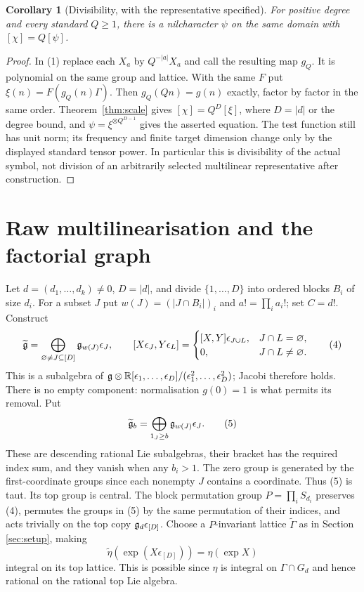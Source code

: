 \documentclass[11pt]{article}
\newtheorem{corollary}[theorem]{Corollary}
\newcommand{\R}{\mathbb R}\newcommand{\Q}{\mathbb Q}
\begin{document}
\begin{corollary}[Divisibility, with the representative specified]\label{cor:divide}
For positive degree and every standard $Q\geq1$, there is a nilcharacter
$\psi$ on the same domain with $[\chi]=Q[\psi]$.
\end{corollary}
\begin{proof}
In (1) replace each $X_a$ by $Q^{-|a|}X_a$ and call the resulting map
$g_Q$. It is polynomial on the same group and lattice. With the same
$F$ put $\xi(n)=F(g_Q(n)\Gamma)$. Then $g_Q(Qn)=g(n)$ exactly, factor
by factor in the same order. Theorem~\ref{thm:scale} gives
$[\chi]=Q^D[\xi]$, where $D=|d|$ or the degree bound, and
$\psi=\xi^{\otimes Q^{D-1}}$ gives the asserted equation.
The test function still has unit norm; its frequency and finite target
dimension change only by the displayed standard tensor power. In
particular this is divisibility of the actual symbol, not division of
an arbitrarily selected multilinear representative after construction.
\end{proof}

\section{Raw multilinearisation and the factorial graph}\label{sec:raw}
Let $d=(d_1,\ldots,d_k)\ne0$, $D=|d|$, and divide $\{1,\ldots,D\}$
into ordered blocks $B_i$ of size $d_i$. For a subset $J$ put
$w(J)=(|J\cap B_i|)_i$ and $a!=\prod_i a_i!$; set $C=d!$.
Construct
\[
 \widetilde{\mathfrak g}=\bigoplus_{\varnothing\ne J\subseteq[D]}\mathfrak g_{w(J)}\epsilon_J,
 \qquad
 [X\epsilon_J,Y\epsilon_L]=
 \begin{cases}[X,Y]\epsilon_{J\cup L},&J\cap L=\varnothing,\\
 0,&J\cap L\ne\varnothing.
 \end{cases}                                             \tag{4}
\]
This is a subalgebra of $\g\otimes
\R[\epsilon_1,\ldots,\epsilon_D]/(\epsilon_1^2,\ldots,\epsilon_D^2)$;
Jacobi therefore holds. There is no empty component: normalisation
$g(0)=1$ is what permits its removal. Put
\[
 \widetilde{\mathfrak g}_b=
 \bigoplus_{1_J\geq b}\mathfrak g_{w(J)}\epsilon_J.                 \tag{5}
\]
These are descending rational Lie subalgebras, their bracket has the
required index sum, and they vanish when any $b_i>1$. The zero group
is generated by the first-coordinate groups since each nonempty $J$
contains a coordinate. Thus (5) is taut. Its top group is central.
The block permutation group $P=\prod_i S_{d_i}$ preserves (4), permutes
the groups in (5) by the same permutation of their indices, and
acts trivially on the top copy $\mathfrak g_d\epsilon_{[D]}$.
Choose a $P$-invariant lattice $\widetilde\Gamma$ as in Section
\ref{sec:setup}, making
\[
 \widetilde\eta(\exp(X\epsilon_{[D]}))=\eta(\exp X)
                                                        \tag{6}
\]
integral on its top lattice. This is possible since $\eta$ is integral
on $\Gamma\cap G_d$ and hence rational on the rational top Lie algebra.
\end{document}
